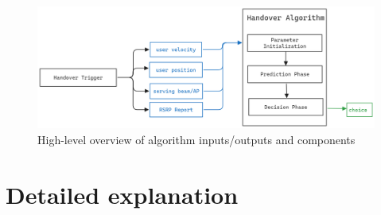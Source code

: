 \begin{figure}
    \centering
    \includegraphics[width=1\linewidth]{Figures/algo-overview.png}
    \caption{High-level overview of algorithm inputs/outputs and components}
    \label{fig:algo-overview}
\end{figure}

\label{subsec:algo_overview}
\section{Detailed explanation}
\label{subsec:algo_exp}
